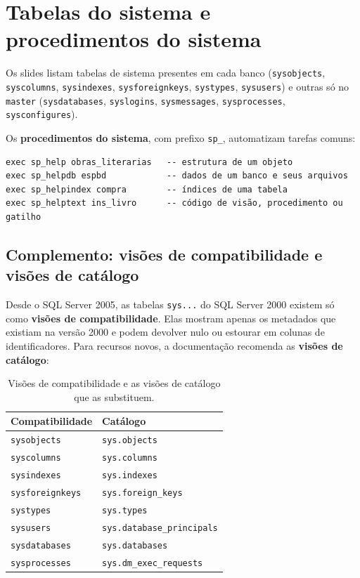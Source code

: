 \section{Tabelas do sistema e procedimentos do sistema}

Os slides listam tabelas de sistema presentes em cada banco
(\texttt{sysobjects}, \texttt{syscolumns}, \texttt{sysindexes},
\texttt{sysforeignkeys}, \texttt{systypes}, \texttt{sysusers}) e outras só
no \texttt{master} (\texttt{sysdatabases}, \texttt{syslogins},
\texttt{sysmessages}, \texttt{sysprocesses}, \texttt{sysconfigures}).

Os \textbf{procedimentos do sistema}, com
prefixo \texttt{sp\_}, automatizam tarefas comuns:

\begin{lstlisting}
exec sp_help obras_literarias   -- estrutura de um objeto
exec sp_helpdb espbd            -- dados de um banco e seus arquivos
exec sp_helpindex compra        -- índices de uma tabela
exec sp_helptext ins_livro      -- código de visão, procedimento ou gatilho
\end{lstlisting}

\subsection*{Complemento: visões de compatibilidade e visões de catálogo}

Desde o SQL Server 2005, as tabelas \texttt{sys...} do SQL Server 2000
existem só como \textbf{visões de compatibilidade}.
Elas mostram apenas os metadados que existiam na versão 2000 e podem
devolver nulo ou estourar em colunas de identificadores. Para recursos
novos, a documentação recomenda as \textbf{visões de catálogo}:

\begin{table}[h]
	\begin{tabular}{ll}
		\toprule
		Compatibilidade & Catálogo \\
		\midrule
		\texttt{sysobjects} & \texttt{sys.objects} \\
		\texttt{syscolumns} & \texttt{sys.columns} \\
		\texttt{sysindexes} & \texttt{sys.indexes} \\
		\texttt{sysforeignkeys} & \texttt{sys.foreign\_keys} \\
		\texttt{systypes} & \texttt{sys.types} \\
		\texttt{sysusers} & \texttt{sys.database\_principals} \\
		\texttt{sysdatabases} & \texttt{sys.databases} \\
		\texttt{sysprocesses} & \texttt{sys.dm\_exec\_requests} \\
		\bottomrule
	\end{tabular}
	\caption{Visões de compatibilidade e as visões de catálogo que as substituem.}
\end{table}

